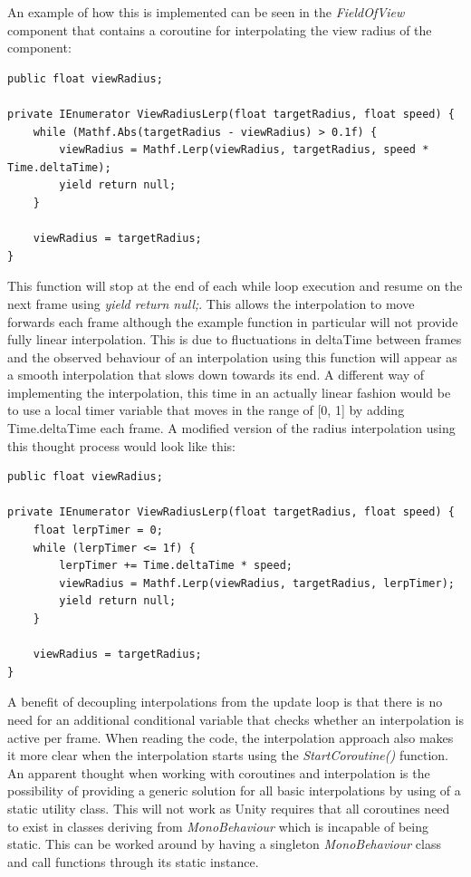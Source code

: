 An example of how this is implemented can be seen in the \emph{FieldOfView} component that contains a coroutine for interpolating the view radius of the component:
\begin{verbatim}
public float viewRadius;

private IEnumerator ViewRadiusLerp(float targetRadius, float speed) {
    while (Mathf.Abs(targetRadius - viewRadius) > 0.1f) {
        viewRadius = Mathf.Lerp(viewRadius, targetRadius, speed * Time.deltaTime);
        yield return null;
    }

    viewRadius = targetRadius;
}
\end{verbatim}
This function will stop at the end of each while loop execution and resume on the next frame using \emph{yield return null;}. This allows the interpolation to move forwards each frame although the example function in particular will not provide fully linear interpolation. This is due to fluctuations in deltaTime between frames and the observed behaviour of an interpolation using this function will appear as a smooth interpolation that slows down towards its end. A different way of implementing the interpolation, this time in an actually linear fashion would be to use a local timer variable that moves in the range of [0, 1] by adding Time.deltaTime each frame. A modified version of the radius interpolation using this thought process would look like this:
\begin{verbatim}
public float viewRadius;

private IEnumerator ViewRadiusLerp(float targetRadius, float speed) {
    float lerpTimer = 0;
    while (lerpTimer <= 1f) {
        lerpTimer += Time.deltaTime * speed;
        viewRadius = Mathf.Lerp(viewRadius, targetRadius, lerpTimer);
        yield return null;
    }

    viewRadius = targetRadius;
}
\end{verbatim}

A benefit of decoupling interpolations from the update loop is that there is no need for an additional conditional variable that checks whether an interpolation is active per frame. When reading the code, the interpolation approach also makes it more clear when the interpolation starts using the \emph{StartCoroutine()} function. 
An apparent thought when working with coroutines and interpolation is the possibility of providing a generic solution for all basic interpolations by using of a static utility class. This will not work as Unity requires that all coroutines need to exist in classes deriving from \emph{MonoBehaviour} which is incapable of being static. This can be worked around by having a singleton \emph{MonoBehaviour} class and call functions through its static instance. 

